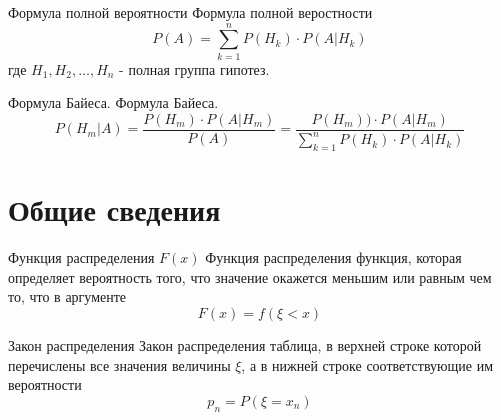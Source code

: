 \documentclass[12pt]{article}
\begin{document}
\begin{theorem}
    {Формула полной вероятности}
    {Формула полной веростности}
    {}
    \begin{displaymath}
        P(A)=\sum\limits_{k=1}^{n}P(H_{k})\cdot P(A|H_{k})
    \end{displaymath}
    где $H_{1},H_{2},\ldots,H_{n}$ - полная группа гипотез.
\end{theorem}

\begin{theorem}
    {Формула Байеса.}
    {Формула Байеса.}
    {}
    \begin{displaymath}
        P(H_{m}|A)=\frac{P(H_{m})\cdot P(A|H_{m})}{P(A)}
        =\frac{P(H_{m}))\cdot
        P(A|H_{m})}{\sum\limits_{k=1}^{n}P(H_{k})\cdot P(A|H_{k})}
    \end{displaymath}
\end{theorem}

\newpage
\section{Общие сведения}
\begin{definition}
    {Функция распределения $F(x)$}
    {Функция распределения}
    функция, которая определяет вероятность того, что значение окажется
    меньшим или равным чем то, что в аргументе
    \begin{displaymath}
        F(x)=f(\xi<x)
    \end{displaymath}
\end{definition}

\begin{definition}
    {Закон распределения}
    {Закон распределения}
    таблица, в верхней строке которой перечислены все значения величины
    $\xi$, а в нижней строке соответствующие им вероятности
    \begin{displaymath}
        p_{n}=P(\xi=x_{n})
    \end{displaymath}
\end{definition}
\end{document}
